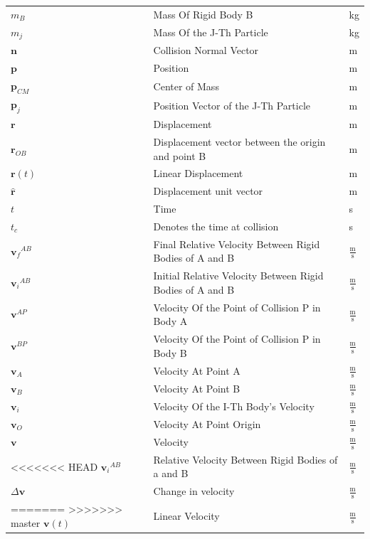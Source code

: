 \documentclass[12pt]{article}
\begin{document}
\begin{longtabu}{l X[l] l}
\\
${m_{B}}$ & Mass Of Rigid Body B & kg
\\
${m_{j}}$ & Mass Of the J-Th Particle & kg
\\
$\mathbf{n}$ & Collision Normal Vector & m
\\
$\mathbf{p}$ & Position & m
\\
${\mathbf{p}_{CM}}$ & Center of Mass & m
\\
${\mathbf{p}_{j}}$ & Position Vector of the J-Th Particle & m
\\
$\mathbf{r}$ & Displacement & m
\\
${\mathbf{r}_{OB}}$ & Displacement vector between the origin and point B & m
\\
$\mathbf{r}(t)$ & Linear Displacement & m
\\
$\mathbf{\hat{r}}$ & Displacement unit vector & m
\\
$t$ & Time & s
\\
${t_{c}}$ & Denotes the time at collision & s
\\
${{\mathbf{v}_{f}}^{AB}}$ & Final Relative Velocity Between Rigid Bodies of A and B & $\frac{\text{m}}{\text{s}}$
\\
${{\mathbf{v}_{i}}^{AB}}$ & Initial Relative Velocity Between Rigid Bodies of A and B & $\frac{\text{m}}{\text{s}}$
\\
${\mathbf{v}^{AP}}$ & Velocity Of the Point of Collision P in Body A & $\frac{\text{m}}{\text{s}}$
\\
${\mathbf{v}^{BP}}$ & Velocity Of the Point of Collision P in Body B & $\frac{\text{m}}{\text{s}}$
\\
${\mathbf{v}_{A}}$ & Velocity At Point A & $\frac{\text{m}}{\text{s}}$
\\
${\mathbf{v}_{B}}$ & Velocity At Point B & $\frac{\text{m}}{\text{s}}$
\\
${\mathbf{v}_{i}}$ & Velocity Of the I-Th Body's Velocity & $\frac{\text{m}}{\text{s}}$
\\
${\mathbf{v}_{O}}$ & Velocity At Point Origin & $\frac{\text{m}}{\text{s}}$
\\
$\mathbf{v}$ & Velocity & $\frac{\text{m}}{\text{s}}$
\\
<<<<<<< HEAD
${{\mathbf{v}_{i}}^{AB}}$ & Relative Velocity Between Rigid Bodies of a and B & $\frac{\text{m}}{\text{s}}$
\\
$Δ\mathbf{v}$ & Change in velocity & $\frac{\text{m}}{\text{s}}$
\\
=======
>>>>>>> master
$\mathbf{v}(t)$ & Linear Velocity & $\frac{\text{m}}{\text{s}}$

\end{longtabu}
\end{document}
